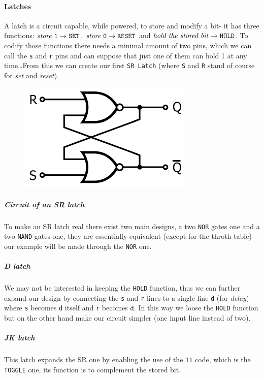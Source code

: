 \documentclass{scrartcl}
\newcommand{\zero}{\texttt{0}}
\newcommand{\one}{\texttt{1}}
\begin{document}
    \paragraph{Latches} A latch is a circuit capable, while powered, to store and modify a bit- it has three functions: $\textrm{\emph{store} \one}\to \texttt{SET}$, $\textrm{\emph{store} \zero}\to \texttt{RESET}$ and $\textrm{\emph{hold the stored bit}}\to \texttt{HOLD}$. To codify those functions there needs a minimal amount of two pins, which we can call the \texttt{s} and \texttt{r} pins and can suppose that just one of them can hold 1 at any time\dots From this we can create our first \texttt{SR Latch} (where \texttt{S} and \texttt{R} stand of course for \emph{set} and \emph{reset}).
    \begin{figure}
        \includegraphics{SR_latch.pdf}
    \end{figure}
    \subparagraph{Circuit of an SR latch} To make an SR latch real there exist two main designs, a two \texttt{NOR} gates one and a two \texttt{NAND} gates one, they are essentially equivalent (except for the throth table)- our example will be made through the \texttt{NOR} one.
    \subparagraph{D latch} We may not be interested in keeping the \texttt{HOLD} function, thus we can further expand our design by connecting the \texttt{s} and \texttt{r} lines to a single line \texttt{d} (for \emph{delay}) where \texttt{s} becomes \texttt{d} itself and \texttt{r} becomes $\overline{\texttt{d}}$. In this way we loose the \texttt{HOLD} function but on the other hand make our circuit simpler (one input line instead of two).
    \subparagraph{JK latch} This latch expands the SR one by enabling the use of the \texttt{11} code, which is the \texttt{TOGGLE} one, its function is to complement the stored bit.
\end{document}
